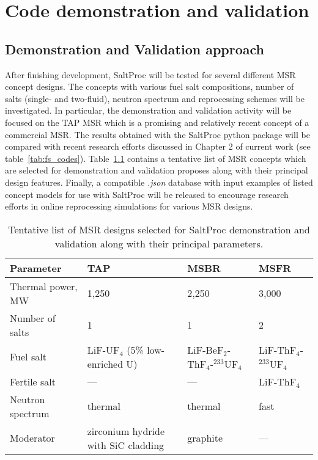 \chapter[Code demonstration and validation]{Code demonstration and validation}

\section{Demonstration and Validation approach}
After finishing development, SaltProc will be tested for several 
different \gls{MSR} concept designs. The concepts with various fuel salt 
compositions, number of salts (single- and two-fluid), neutron spectrum and 
reprocessing schemes will be investigated. In particular, the demonstration 
and validation activity will be focused on the \gls{TAP} \gls{MSR} which is a 
promising and relatively recent concept of a commercial \gls{MSR}. The results 
obtained with the SaltProc python package will be compared with recent research 
efforts discussed in Chapter 2 of current work (see table~\ref{tab:fs_codes}). 
Table~\ref{tab:msr_concepts} 
contains a tentative list of \gls{MSR} concepts which are selected for 
demonstration and validation proposes along with their principal design features. 
Finally, a compatible \textit{.json} database with input examples of listed 
concept models for use with SaltProc will be released to encourage 
research efforts in online reprocessing simulations for various 
\gls{MSR} designs.
\begin{table}[!htb]
  \centering
  \caption{Tentative list of \gls{MSR} designs selected for SaltProc 
  demonstration and validation along with their principal parameters.}
  \label{tab:msr_concepts} 
  \begin{tabular}{p{} p{} p{} p{} } \toprule 
   Parameter & \gls{TAP} & \gls{MSBR} & \gls{MSFR}  \\ \midrule
   Thermal power, MW	&  1,250   & 2,250     & 3,000     \\ 
   Number of salts      & 1 		& 1 		& 2  		\\ 
   Fuel salt 			& LiF-UF$_4$ \newline (5\% low-enriched U) & LiF-BeF$_2$-ThF$_4$-$^{233}$UF$_4$ & 
   LiF-ThF$_4$-$^{233}$UF$_4$  \\
   Fertile salt 		& --- & --- &   LiF-ThF$_4$  \\
   Neutron spectrum     & thermal  & thermal & fast \\
   Moderator            & zirconium hydride with SiC cladding  & graphite & --- \\
     \bottomrule 
   \end{tabular}
\end{table}

